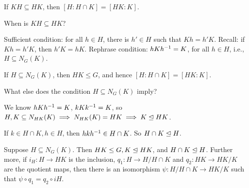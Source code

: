 \begin{corr}
If $KH\subseteq HK$, then $[H:H\cap K]= [HK:K]$.
\end{corr}

When is $KH\subseteq HK$?

Sufficient condition: for all $h\in H$, there is $h'\in H$ such that $Kh=h'K$. Recall: if $Kh=h'K$, then $h'K=hK$. Rephrase condition: $hKh^{-1} = K$, for all $h\in H$, i.e., $H\subseteq N_G(K)$.

\begin{corr}
If $H\subseteq N_G(K)$, then $HK\le G$, and hence $[H:H\cap K] = [HK:K]$.
\end{corr}
What else does the condition $H\subseteq N_G(K)$ imply?

We know $hKh^{-1} =K$, $kKk^{-1} = K$, so $H,K\subseteq N_{HK}(K)\implies N_{HK}(K)=HK \implies K\trianglelefteq HK$.

If $k\in H\cap K,h\in H$, then $hkh^{-1} \in H\cap K$. So $H\cap K\trianglelefteq H$.

\begin{thm}
Suppose $H\subseteq N_G(K)$. Then $HK\le G,K\trianglelefteq HK$, and $H\cap K\trianglelefteq H$. Further more, if $i_H:H\to HK$ is the inclusion, $q_1:H\to H/H\cap K$ and $q_2:HK\to HK/K$ are the quotient maps, then there is an isomorphism $\psi:H/H\cap K\to HK/K$ such that $\psi\circ q_1=q_2\circ iH$.
\end{thm}

